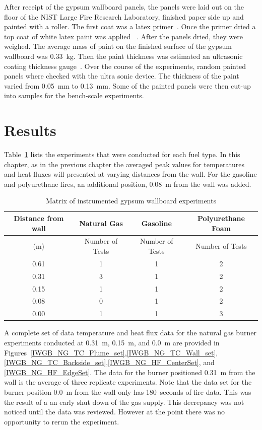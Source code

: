 \documentclass[twoside]{uocthesis}
\begin{document}
After receipt of the gypsum wallboard panels, the panels were laid out on the floor of the NIST Large Fire Research Laboratory, finished paper side up and painted with a roller.  The first coat was a latex primer~\cite{Latex_Primer}.  Once the primer dried a top coat of white latex paint was applied ~\cite{Latex_Paint}.  After the panels dried, they were weighed. The average mass of paint on the finished surface of the gypsum wallboard was 0.33~kg. Then the paint thickness was estimated an ultrasonic coating thickness gauge~\cite{defelsko}.  Over the course of the experiments, random painted panels where checked with the ultra sonic device. The thickness of the paint varied from 0.05~mm to 0.13~mm.  Some of the painted panels were then cut-up into samples for the bench-scale experiments.


\section{Results}

Table~\ref{tab:IWGB_experiments} lists the experiments that were conducted for each fuel type.  In this chapter, as in the previous chapter the averaged peak values for temperatures and heat fluxes will presented at varying distances from the wall.  For the gasoline and polyurethane fires, an additional position, 0.08~m from the wall was added.

\begin{table}[ht!]
	\centering
	\begin{tabular}{|c|c|c|c|}
		\hline Distance from wall  	& Natural Gas 		& Gasoline			& Polyurethane Foam \\
		\hline (m) 					& Number of Tests 	& Number of Tests  	& Number of Tests 	\\ \hline
		\hline 0.61 				& 1 				& 1 				& 2 			 	\\
		\hline 0.31					& 3	 				& 1					& 2 			 	\\
		\hline 0.15					& 1				 	& 1					& 2 			 	\\
		\hline 0.08					& 0 				& 1 				& 2 	 			\\
		\hline 0.00					& 1 				& 1 				& 3 	 			\\
		\hline
	\end{tabular}
	\caption[Matrix of instrumented gypsum wallboard experiments]{Matrix of instrumented gypsum wallboard experiments}
	\label{tab:IWGB_experiments}
\end{table}

A complete set of data temperature and heat flux data for the natural gas burner experiments conducted at 0.31~m, 0.15~m, and 0.0~m are provided in Figures~\ref{IWGB_NG_TC_Plume_set},\ref{IWGB_NG_TC_Wall_set},\ref{IWGB_NG_TC_Backside_set},\ref{IWGB_NG_HF_CenterSet}, and \ref{IWGB_NG_HF_EdgeSet}.  The data for the burner positioned 0.31~m from the wall is the average of three replicate experiments.  Note that the data set for the burner position 0.0~m from the wall only has 180~seconds of fire data.  This was the result of a an early shut down of the gas supply.  This decrepancy was not noticed until the data was reviewed.  However at the point there was no opportunity to rerun the experiment.    
\end{document}
